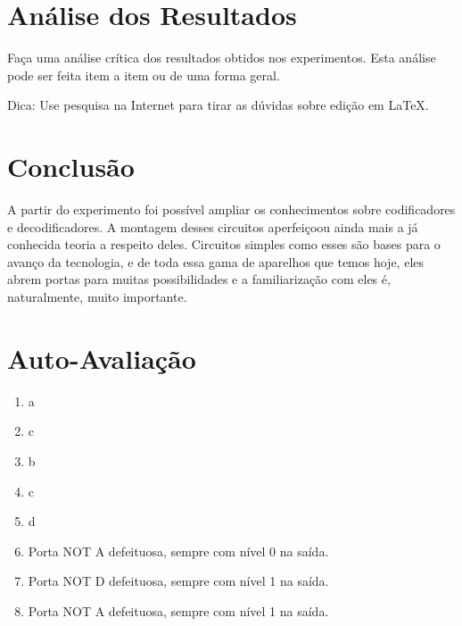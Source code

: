 \documentclass[12pt]{article}
\begin{document}
\section{Análise dos Resultados}
\label{sec:Resultados}

Faça uma análise crítica dos resultados obtidos nos experimentos. Esta análise pode ser feita item a item ou de uma forma geral.

Dica: Use pesquisa na Internet para tirar as dúvidas sobre edição em \LaTeX .

\section{Conclusão}
\label{sec:Conclusao}

A partir do experimento foi possível ampliar os conhecimentos sobre codificadores e decodificadores. A montagem desses circuitos aperfeiçoou ainda mais a já conhecida teoria a respeito deles. Circuitos simples como esses são bases para o avanço da tecnologia, e de toda essa gama de aparelhos que temos hoje, eles abrem portas para muitas possibilidades e a familiarização com eles é, naturalmente, muito importante.






\newpage 
\section*{Auto-Avaliação}

\begin{enumerate}
    \item a
    \item c
    \item b
    \item c
    \item d
    \item Porta NOT A defeituosa, sempre com nível 0 na saída.
    \item Porta NOT D defeituosa, sempre com nível 1 na saída. 
    \item Porta NOT A defeituosa, sempre com nível 1 na saída.
\end{enumerate}
\end{document}

